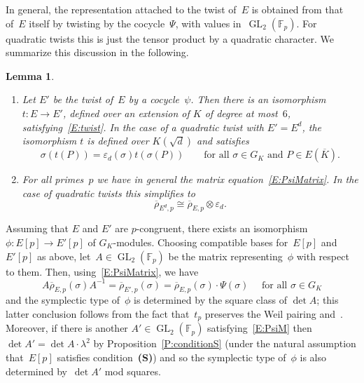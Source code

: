 \documentclass[12pt, reqno]{amsart}
\newcommand{\Fp}{\mathbb{F}_p}
\newcommand{\Kbar}{{\overline{K}}}
\newcommand{\rhobar}{{\overline{\rho}}}
\newcommand{\eps}{\varepsilon}
\newcommand{\GL}{\operatorname{GL}}
\numberwithin{equation}{section}
\newtheorem{lemma}[theorem]{Lemma}
\theoremstyle{definition}
\theoremstyle{remark}
\begin{document}
In general, the representation attached to the twist of~$E$ is
obtained from that of~$E$ itself by twisting by the cocycle~$\Psi$, with
values in~$\GL_2(\Fp)$.  For quadratic twists this is just the tensor product
by a quadratic character.
We summarize this discussion in the following.

\begin{lemma}\label{L:twist-rep} \hfill
  \begin{enumerate}
\item Let $E'$ be the twist of~$E$ by a cocycle~$\psi$. Then there is
  an isomorphism $t :E\to E'$, defined over an extension of $K$ of
  degree at most~$6$, satisfying~\eqref{E:twist}.
  In the case of a quadratic twist with $E'=E^d$, the isomorphism $t$
  is defined over $K(\sqrt{d})$ and satisfies
\begin{equation}\label{E:iso-twist}
\sigma(t (P)) = \eps_d(\sigma)t (\sigma(P)) \qquad\text{for
  all~$\sigma\in G_K$ and $P\in E(\Kbar)$}.
\end{equation}
\item For all primes~$p$ we have in general the matrix
  equation~\eqref{E:PsiMatrix}.
In the case of quadratic twists this simplifies to
  \begin{equation} \label{E:rho-twist}
  \rhobar_{E^d,p} \cong \rhobar_{E,p}\otimes\eps_d.
\end{equation}
\end{enumerate}
\end{lemma}

Assuming that $E$ and $E'$ are $p$-congruent, there exists an
isomorphism $\phi : E[p] \to E'[p]$
of $G_K$-modules. 
Choosing
compatible bases for~$E[p]$ and~$E'[p]$ as above, let~$A \in
\GL_2(\Fp)$ be the matrix representing~$\phi$ with respect to them.
Then, using~\eqref{E:PsiMatrix}, we have
\begin{equation}\label{E:PsiM}
A \rhobar_{E,p}(\sigma) A^{-1} = \rhobar_{E',p}(\sigma) =
\rhobar_{E,p}(\sigma) \cdot \Psi(\sigma) \quad \text{ for all } \sigma
\in G_K
\end{equation}
and the 
symplectic type of~$\phi$ is determined by the square class of $\det A$; this latter conclusion follows 
from the fact that~$t_p$ preserves the Weil pairing
and~\cite[Lemma~6]{FKSym}. Moreover, if there is another $A' \in
\GL_2(\Fp)$  satisfying~\eqref{E:PsiM} then $\det A' = \det A \cdot
\lambda^2$ by Proposition~\ref{P:conditionS} (under the natural
assumption that~$E[p]$ satisfies condition~{\bf (S)}) and so the symplectic type of~$\phi$ is also determined by~$\det A'$ mod squares.
\end{document}
